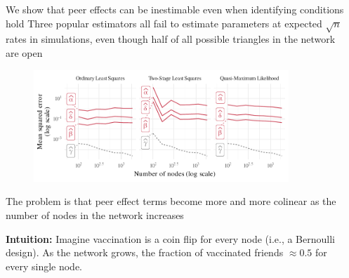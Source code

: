 \documentclass[final]{beamer}
\newlength{\sepwidth}
\newlength{\colwidth}
\newcommand{\separatorcolumn}{\begin{column}{\sepwidth}\end{column}}
\begin{document}
\begin{frame}[t]
\begin{columns}[t]
        \separatorcolumn

        \begin{column}{\colwidth}


            \begin{block}{We show that peer effects can be inestimable even when identifying conditions hold}
                Three popular estimators all fail to estimate parameters at expected $\sqrt{n}$ rates in simulations, even though half of all possible triangles in the network are open
                \begin{figure}
                    \centering
                    \includegraphics[width=0.9\textwidth]{./figures/simulations/biometrika-mse.pdf}
                \end{figure}
            \end{block}

            \begin{block}{The problem is that peer effect terms become more and more colinear as the number of nodes in the network increases}

                \textbf{Intuition:} Imagine vaccination is a coin flip for every node (i.e., a Bernoulli design). As the network grows, the fraction of vaccinated friends $\approx 0.5$ for every single node.


\end{block}
\end{column}
\end{columns}
\end{frame}
\end{document}
